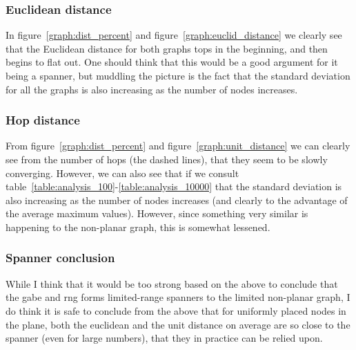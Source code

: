 \subsubsection{Euclidean distance}

In figure~\ref{graph:dist_percent} and figure~\ref{graph:euclid_distance} we clearly see that the Euclidean distance for both graphs tops in the beginning, and then begins to flat out. One should think that this would be a good argument for it being a spanner, but muddling the picture is the fact that the standard deviation for all the graphs is also increasing as the number of nodes increases.

\subsubsection{Hop distance}


From figure~\ref{graph:dist_percent} and figure~\ref{graph:unit_distance} we can clearly see from the number of hops (the dashed lines), that they seem to be slowly converging. However, we can also see that if we consult table~\ref{table:analysis_100}-\ref{table:analysis_10000} that the standard deviation is also increasing as the number of nodes increases (and clearly to the advantage of the average maximum values). However, since something very similar is happening to the non-planar graph, this is somewhat lessened.

\subsubsection{Spanner conclusion}

While I think that it would be too strong based on the above to conclude that the \ac{gabe} and \ac{rng} forms limited-range spanners to the limited non-planar graph, I do think it is safe to conclude from the above that for uniformly placed nodes in the plane, both the euclidean and the unit distance on average are so close to the spanner (even for large numbers), that they in practice can be relied upon.

\subsection{}
